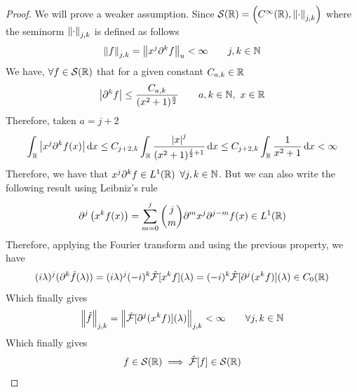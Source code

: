 \documentclass[../complete.tex]{subfiles}
\begin{document}
\begin{proof}
	We will prove a weaker assumption. Since $\mathcal{S}(\mathbb{R})=\left(C^\infty(\mathbb{R}),\norm{\cdot}_{j,k}\right)$ where the seminorm $\norm{\cdot}_{j,k}$ is defined as follows
	\begin{equation*}
		\norm{f}_{j,k}=\norm{x^j\partial^kf}_u<\infty\qquad j,k\in\mathbb{N}
	\end{equation*}
	We have, $\forall f\in\mathcal{S}(\mathbb{R})$ that for a given constant $C_{a,k}\in\mathbb{R}$
	\begin{equation*}
		\abs{\partial^kf}\le\frac{C_{a,k}}{(x^2+1)^{\frac{a}{2}}}\qquad a,k\in\mathbb{N},\ x\in\mathbb{R}
	\end{equation*}
	Therefore, taken $a=j+2$
	\begin{equation*}
		\int_{\mathbb{R}}^{}\abs{x^j\partial^kf(x)}\operatorname{d\!} x\le C_{j+2,k}\int_{\mathbb{R}}^{}\frac{\abs{x}^j}{(x^2+1)^{\frac{j}{2}+1}}\operatorname{d\!} x\le C_{j+2,k}\int_{\mathbb{R}}^{}\frac{1}{x^2+1}\operatorname{d\!} x<\infty
	\end{equation*}
	Therefore, we have that $x^j\partial^kf\in L^1(\mathbb{R})$ $\forall j,k\in\mathbb{N}$. But we can also write the following result using Leibniz's rule
	\begin{equation*}
		\partial^j\left( x^kf(x) \right)=\sum_{m=0}^{j}\binom{j}{m}\partial^mx^j\partial^{j-m}f(x)\in L^1(\mathbb{R})
	\end{equation*}
	Therefore, applying the Fourier transform and using the previous property, we have
	\begin{equation*}
		(i\lambda)^j(\partial^k\hat{f}(\lambda))=(i\lambda)^j(-i)^k\hat{\mathcal{F}}[x^kf](\lambda)=(-i)^k\hat{\mathcal{F}}[\partial^j(x^kf)](\lambda)\in C_0(\mathbb{R})
	\end{equation*}
	Which finally gives
	\begin{equation*}
		\norm{\hat{f}}_{j,k}=\norm{\hat{\mathcal{F}}[\partial^j(x^kf)](\lambda)}_{j,k}<\infty\qquad\forall j,k\in\mathbb{N}
	\end{equation*}
	Which finally gives
	\begin{equation*}
		f\in\mathcal{S}(\mathbb{R})\implies{}\hat{\mathcal{F}}[f]\in\mathcal{S}(\mathbb{R})
	\end{equation*}
\end{proof}
\end{document}
